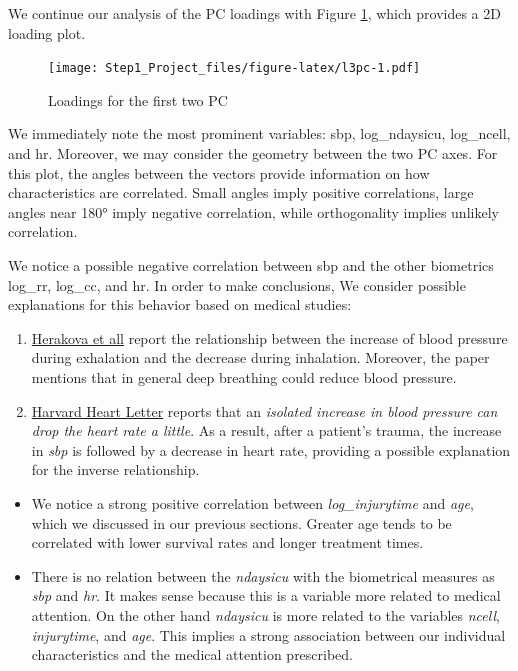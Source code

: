 \documentclass[
]{article}
\begin{document}
We continue our analysis of the PC loadings with Figure \ref{fig:l3pc},
which provides a 2D loading plot.

\begin{figure}
\centering
\texttt{[image: Step1\_Project\_files/figure-latex/l3pc-1.pdf]}
\caption{Loadings for the first two PC\label{fig:l3pc}}
\end{figure}

We immediately note the most prominent variables: sbp, log\_ndaysicu,
log\_ncell, and hr. Moreover, we may consider the geometry between the
two PC axes. For this plot, the angles between the vectors provide
information on how characteristics are correlated. Small angles imply
positive correlations, large angles near 180° imply negative
correlation, while orthogonality implies unlikely correlation.

We notice a possible negative correlation between sbp and the other
biometrics log\_rr, log\_cc, and hr. In order to make conclusions, We
consider possible explanations for this behavior based on medical
studies:

\begin{enumerate}
\def\labelenumi{\arabic{enumi}.}
\item
  \href{https://clinicalhypertension.biomedcentral.com/articles/10.1186/s40885-017-0071-3}{Herakova
  et all} report the relationship between the increase of blood pressure
  during exhalation and the decrease during inhalation. Moreover, the
  paper mentions that in general deep breathing could reduce blood
  pressure.
\item
  \href{https://www.health.harvard.edu/heart-health/does-heart-rate-affect-blood-pressure}{Harvard
  Heart Letter} reports that an \emph{isolated increase in blood
  pressure can drop the heart rate a little}. As a result, after a
  patient's trauma, the increase in \emph{sbp} is followed by a decrease
  in heart rate, providing a possible explanation for the inverse
  relationship.
\end{enumerate}

\begin{itemize}
\item
  We notice a strong positive correlation between \emph{log\_injurytime}
  and \emph{age}, which we discussed in our previous sections. Greater
  age tends to be correlated with lower survival rates and longer
  treatment times.
\item
  There is no relation between the \emph{ndaysicu} with the biometrical
  measures as \emph{sbp} and \emph{hr}. It makes sense because this is a
  variable more related to medical attention. On the other hand
  \emph{ndaysicu} is more related to the variables \emph{ncell},
  \emph{injurytime}, and \emph{age}. This implies a strong association
  between our individual characteristics and the medical attention
  prescribed.
\end{itemize}
\end{document}
